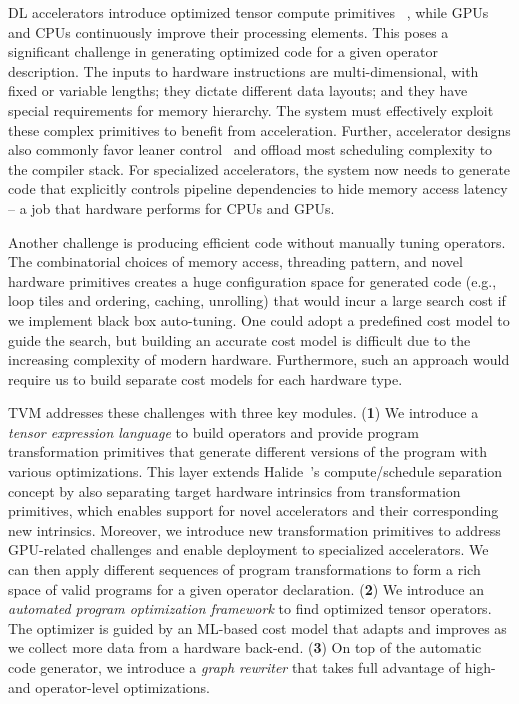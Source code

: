 \documentclass[letterpaper,twocolumn,10pt]{article}
\newcommand{\TensorOpt}{TVM\xspace}
\begin{document}
\vspace{0.5ex} 
DL accelerators introduce optimized tensor compute primitives
~\cite{Jouppi:TPU,volta-whitepaper,Chen:Eyeriss}, while GPUs and CPUs continuously improve their processing elements. This poses a significant challenge in generating optimized code for a given operator description.
The inputs to hardware instructions are multi-dimensional, with fixed or variable lengths; they dictate different data layouts; and they have special requirements for memory hierarchy.  The system must effectively exploit these complex primitives to benefit from acceleration. Further, accelerator designs also commonly favor leaner control~\cite{Jouppi:TPU} and offload most scheduling complexity to the compiler stack. For specialized accelerators, the system now needs to generate code that explicitly controls pipeline dependencies to hide memory access latency -- a job that hardware performs for CPUs and GPUs.

\vspace{0.5ex} 
Another challenge is producing efficient code without manually tuning operators.  The combinatorial choices of memory access, threading pattern, and novel hardware primitives creates a huge configuration space for generated code (e.g., loop tiles and ordering, caching, unrolling) that would incur a large search cost if we implement black box auto-tuning. One could adopt a predefined cost model to guide the search, but building an accurate cost model is difficult due to the increasing complexity of modern hardware. Furthermore, such an approach would require us to build separate cost models for each hardware type.

\TensorOpt addresses these challenges with three key modules.
(\textbf{1}) We introduce a \textit{tensor expression language} to build operators and provide program transformation primitives that generate  different versions of the program with various optimizations. This layer extends Halide~\cite{JRK:Halide}'s compute/schedule separation concept by also separating target hardware intrinsics from transformation primitives, which enables support for novel accelerators and their corresponding new intrinsics. Moreover, we introduce new transformation primitives to address GPU-related challenges and enable deployment to specialized accelerators. We can then apply different sequences of program transformations to form a rich space of valid programs for a given operator declaration. (\textbf{2}) We introduce an \textit{automated program optimization framework} to find optimized tensor operators. The optimizer is guided by an ML-based cost model that adapts and improves as we collect more data from a hardware back-end. (\textbf{3}) On top of the automatic code generator, we introduce a \textit{graph rewriter} that takes full advantage of high-  and operator-level optimizations.
\end{document}
